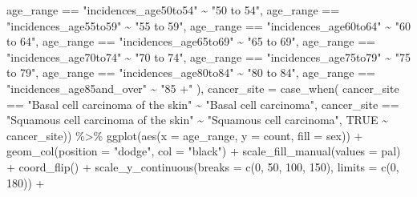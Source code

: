 \documentclass[
]{article}
\newenvironment{Shaded}{\begin{snugshade}}{\end{snugshade}}
\newcommand{\AttributeTok}[1]{\textcolor[rgb]{0.77,0.63,0.00}{#1}}
\newcommand{\ConstantTok}[1]{\textcolor[rgb]{0.00,0.00,0.00}{#1}}
\newcommand{\DecValTok}[1]{\textcolor[rgb]{0.00,0.00,0.81}{#1}}
\newcommand{\FunctionTok}[1]{\textcolor[rgb]{0.00,0.00,0.00}{#1}}
\newcommand{\NormalTok}[1]{#1}
\newcommand{\SpecialCharTok}[1]{\textcolor[rgb]{0.00,0.00,0.00}{#1}}
\newcommand{\StringTok}[1]{\textcolor[rgb]{0.31,0.60,0.02}{#1}}
\begin{document}
\begin{Shaded}
\begin{Highlighting}[]
\NormalTok{    age\_range }\SpecialCharTok{==} \StringTok{"incidences\_age50to54"} \SpecialCharTok{\textasciitilde{}} \StringTok{"50 to 54"}\NormalTok{,}
\NormalTok{    age\_range }\SpecialCharTok{==} \StringTok{"incidences\_age55to59"} \SpecialCharTok{\textasciitilde{}} \StringTok{"55 to 59"}\NormalTok{,}
\NormalTok{    age\_range }\SpecialCharTok{==} \StringTok{"incidences\_age60to64"} \SpecialCharTok{\textasciitilde{}} \StringTok{"60 to 64"}\NormalTok{,}
\NormalTok{    age\_range }\SpecialCharTok{==} \StringTok{"incidences\_age65to69"} \SpecialCharTok{\textasciitilde{}} \StringTok{"65 to 69"}\NormalTok{,}
\NormalTok{    age\_range }\SpecialCharTok{==} \StringTok{"incidences\_age70to74"} \SpecialCharTok{\textasciitilde{}} \StringTok{"70 to 74"}\NormalTok{,}
\NormalTok{    age\_range }\SpecialCharTok{==} \StringTok{"incidences\_age75to79"} \SpecialCharTok{\textasciitilde{}} \StringTok{"75 to 79"}\NormalTok{,}
\NormalTok{    age\_range }\SpecialCharTok{==} \StringTok{"incidences\_age80to84"} \SpecialCharTok{\textasciitilde{}} \StringTok{"80 to 84"}\NormalTok{,}
\NormalTok{    age\_range }\SpecialCharTok{==} \StringTok{"incidences\_age85and\_over"} \SpecialCharTok{\textasciitilde{}} \StringTok{"85 +"}
\NormalTok{  ),}
  \AttributeTok{cancer\_site =} \FunctionTok{case\_when}\NormalTok{(}
\NormalTok{    cancer\_site }\SpecialCharTok{==} \StringTok{"Basal cell carcinoma of the skin"} \SpecialCharTok{\textasciitilde{}} 
      \StringTok{"Basal cell carcinoma"}\NormalTok{,}
\NormalTok{    cancer\_site }\SpecialCharTok{==} \StringTok{"Squamous cell carcinoma of the skin"} \SpecialCharTok{\textasciitilde{}} 
      \StringTok{"Squamous cell carcinoma"}\NormalTok{,}
    \ConstantTok{TRUE} \SpecialCharTok{\textasciitilde{}}\NormalTok{ cancer\_site)) }\SpecialCharTok{\%\textgreater{}\%} 
  \FunctionTok{ggplot}\NormalTok{(}\FunctionTok{aes}\NormalTok{(}\AttributeTok{x =}\NormalTok{ age\_range, }\AttributeTok{y =}\NormalTok{ count, }\AttributeTok{fill =}\NormalTok{ sex)) }\SpecialCharTok{+}
  \FunctionTok{geom\_col}\NormalTok{(}\AttributeTok{position =} \StringTok{"dodge"}\NormalTok{, }\AttributeTok{col =} \StringTok{"black"}\NormalTok{) }\SpecialCharTok{+}
  \FunctionTok{scale\_fill\_manual}\NormalTok{(}\AttributeTok{values =}\NormalTok{ pal) }\SpecialCharTok{+}
  \FunctionTok{coord\_flip}\NormalTok{() }\SpecialCharTok{+} 
  \FunctionTok{scale\_y\_continuous}\NormalTok{(}\AttributeTok{breaks =} \FunctionTok{c}\NormalTok{(}\DecValTok{0}\NormalTok{, }\DecValTok{50}\NormalTok{, }\DecValTok{100}\NormalTok{, }\DecValTok{150}\NormalTok{), }\AttributeTok{limits =} \FunctionTok{c}\NormalTok{(}\DecValTok{0}\NormalTok{, }\DecValTok{180}\NormalTok{)) }\SpecialCharTok{+}

\end{Highlighting}
\end{Shaded}
\end{document}
